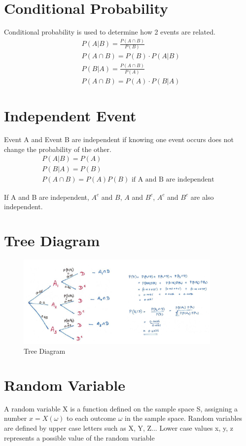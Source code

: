 \documentclass{article}
\begin{document}
    \section*{Conditional Probability}
    Conditional probability is used to determine how 2 events are related. 
    \begin{align*}
        &P(A|B) = \frac{P(A\cap B)}{P(B)}\\
        &P(A\cap B) = P(B) \cdot P(A|B)\\
        &P(B|A) = \frac{P(A\cap B)}{P(A)}\\
        &P(A\cap B) = P(A) \cdot P(B|A)
    \end{align*}

    \section*{Independent Event}
    Event A and Event B are independent if knowing one event occurs does not change the probability of 
    the other.
    \begin{align*}
        P(A|B) = P(A)\\
        P(B|A) = P(B)\\
        P(A\cap B) = P(A)P(B) \text{ if A and B are independent}
    \end{align*}

    If A and B are independent, $A^{c}$ and $B$, $A$ and $B^{c}$, $A^{c}$ and $B^{c}$ are also 
    independent.

    \section*{Tree Diagram}
        \begin{figure}[H]
            \centering
            \includegraphics[width=10cm]{figures/tree.PNG}
            \caption{Tree Diagram}
            \label{fig:tree}
        \end{figure}
   
    \section{Random Variable}
    A random variable X is a function defined on the sample space S, assigning a number $x = X(\omega)$ to each outcome $\omega$ 
    in the sample space. Random variables are  defined by upper case letters such as X, Y, Z... Lower case values x, y, z represents a possible value of the 
    random variable
\end{document}
